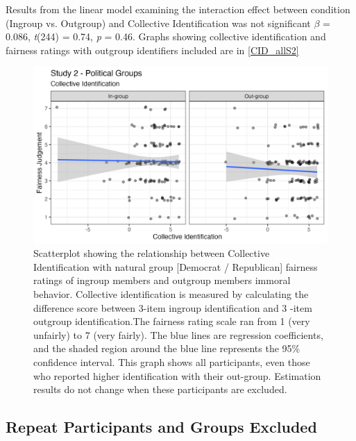 \documentclass[12pt,]{article}
\begin{document}
\clearpage

Results from the linear model examining the interaction effect between condition (Ingroup vs. Outgroup) and Collective Identification was not significant $\beta$ = 0.086, \emph{t}(244) = 0.74, \emph{p} = 0.46. Graphs showing collective identification and fairness ratings with outgroup identifiers included are in \cref{CID_allS2}

\vspace{0.5cm}

\begin{figure}
	\centering
	\includegraphics{Plots/Study2_CI_all.png}
	\caption{Scatterplot showing the relationship between Collective Identification with natural group [Democrat / Republican] fairness ratings of ingroup members and outgroup members immoral behavior. Collective identification is measured by calculating the difference score between 3-item ingroup identification and 3 -item outgroup identification.The fairness rating scale ran from 1 (very unfairly) to 7 (very fairly). The blue lines are regression coefficients, and the shaded region around the blue line represents the 95\% confidence interval. This graph shows all participants, even those who reported higher identification with their out-group. Estimation results do not change when these participants are excluded. }
	\label{fig:CID_allS2}
\end{figure}






\newpage
\subsection{Repeat Participants and Groups Excluded}
\label{appendix:exclude}
\end{document}
